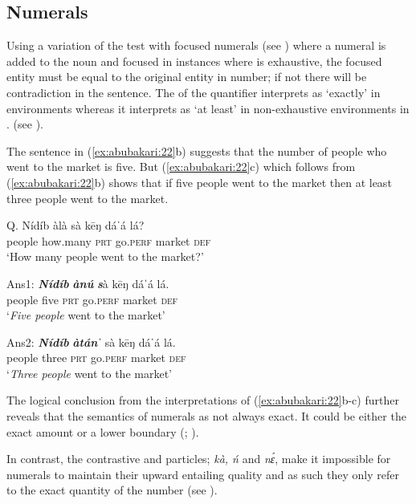 \documentclass[output=paper,modfonts,nonflat,
\ChapterDOI{10.5281/zenodo.3367154}
 hidelinks
]{langsci/langscibook}
\begin{document}
\subsection{Numerals}

Using a variation of the  test with focused numerals (see \citealt{szabolcsi1981,ÉKiss1998}) where a numeral is added to the noun and focused in instances where  is exhaustive, the focused entity must be equal to the original entity in number; if not there will be contradiction in the sentence. The  of the quantifier interprets as ‘exactly’ in  environments whereas it interprets as ‘at least’ in non-exhaustive environments in . (see \citealt[155]{szabolcsi1981}).

 The sentence in (\ref{ex:abubakari:22}b) suggests that the number of people who went to the market is five. But (\ref{ex:abubakari:22}c) which follows from (\ref{ex:abubakari:22}b) shows that if five people went to the market then at least three people went to the market. 

 
\ea\label{ex:abubakari:22}
\ea\label{ex:abubakari:22a} 
Q. \gll Nídíb  àlà    sà  k\={e}ŋ dáˈá  lá? \\
people  how.many  \textsc{prt}  go.\textsc{perf} market  \textsc{def}\\                
\glt ‘How many people went to the market?’ 
 
\ex\label{ex:abubakari:22b} 
Ans1: \gll \textbf{\textit{Nídíb}}    \textbf{\textit{ànú}}  \textbf{\textit{s}}à  k\={e}ŋ dáˈá  lá.\\ 
people    five  \textsc{prt}  go.\textsc{perf} market  \textsc{def}\\
\glt ‘\textit{Five people} went to the market’ 

\ex\label{ex:abubakari:22c} 
Ans2: \gll \textbf{\textit{Nídíb}}    \textbf{\textit{àtánˈ}} sà  k\={e}ŋ dáˈá  lá.\\
people    three  \textsc{prt}  go.\textsc{perf} market  \textsc{def}\\
\glt ‘\textit{Three people} went to the market’
\z
\z

The logical conclusion from the interpretations of (\ref{ex:abubakari:22}b-c) further reveals that the semantics of numerals as not always exact. It could be either the exact amount or a lower boundary (\citealt{horn1972,levinson2000}; \citealt[cf][15]{vanderWal2013}).

In contrast, the contrastive and  particles; \textit{kà, ń} and \textit{nɛ́}, make it impossible for numerals to maintain their upward entailing quality and as such they only refer to the exact quantity of the number (see \citealt{vanKuppevelt1996,vanRooij2002,vanRooij2004}).
\end{document}
